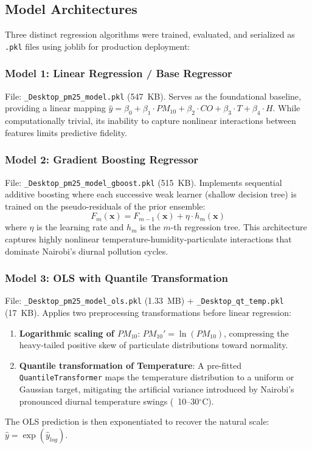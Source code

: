 \documentclass[12pt,a4paper]{article}
\begin{document}
\subsection{Model Architectures}
Three distinct regression algorithms were trained, evaluated, and serialized as \texttt{.pkl} files using joblib for production deployment:

\subsubsection{Model 1: Linear Regression / Base Regressor}
File: \texttt{\_Desktop\_pm25\_model.pkl} (547~KB). Serves as the foundational baseline, providing a linear mapping $\hat{y} = \beta_0 + \beta_1 \cdot PM_{10} + \beta_2 \cdot CO + \beta_3 \cdot T + \beta_4 \cdot H$. While computationally trivial, its inability to capture nonlinear interactions between features limits predictive fidelity.

\subsubsection{Model 2: Gradient Boosting Regressor}
File: \texttt{\_Desktop\_pm25\_model\_gboost.pkl} (515~KB). Implements sequential additive boosting where each successive weak learner (shallow decision tree) is trained on the pseudo-residuals of the prior ensemble:
\begin{equation}
    F_m(\mathbf{x}) = F_{m-1}(\mathbf{x}) + \eta \cdot h_m(\mathbf{x})
\end{equation}
where $\eta$ is the learning rate and $h_m$ is the $m$-th regression tree. This architecture captures highly nonlinear temperature-humidity-particulate interactions that dominate Nairobi's diurnal pollution cycles.

\subsubsection{Model 3: OLS with Quantile Transformation}
File: \texttt{\_Desktop\_pm25\_model\_ols.pkl} (1.33~MB) + \texttt{\_Desktop\_qt\_temp.pkl} (17~KB). Applies two preprocessing transformations before linear regression:
\begin{enumerate}[nosep]
    \item \textbf{Logarithmic scaling of $PM_{10}$}: $PM_{10}' = \ln(PM_{10})$, compressing the heavy-tailed positive skew of particulate distributions toward normality.
    \item \textbf{Quantile transformation of Temperature}: A pre-fitted \texttt{QuantileTransformer} maps the temperature distribution to a uniform or Gaussian target, mitigating the artificial variance introduced by Nairobi's pronounced diurnal temperature swings (~10--30$^\circ$C).
\end{enumerate}
The OLS prediction is then exponentiated to recover the natural scale: $\hat{y} = \exp(\hat{y}_{log})$.
\end{document}
